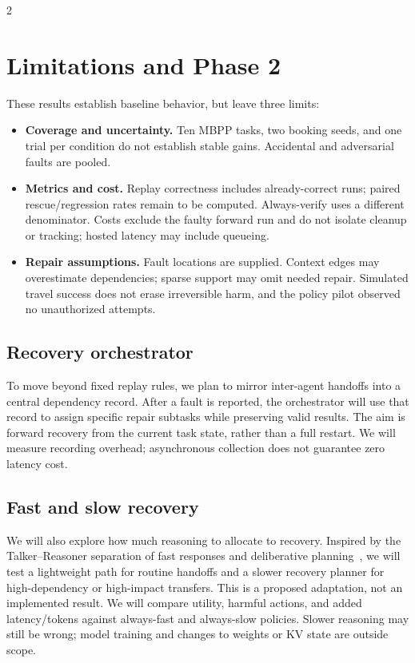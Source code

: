 \documentclass[9pt]{extarticle}
\begin{document}
\begin{multicols}{2}
\section{Limitations and Phase 2}
These results establish baseline behavior, but leave three limits:
\begin{itemize}
\item \textbf{Coverage and uncertainty.} Ten MBPP tasks, two booking seeds, and one trial per condition do not establish stable gains. Accidental and adversarial faults are pooled.
\item \textbf{Metrics and cost.} Replay correctness includes already-correct runs; paired rescue/regression rates remain to be computed. Always-verify uses a different denominator. Costs exclude the faulty forward run and do not isolate cleanup or tracking; hosted latency may include queueing.
\item \textbf{Repair assumptions.} Fault locations are supplied. Context edges may overestimate dependencies; sparse support may omit needed repair. Simulated travel success does not erase irreversible harm, and the policy pilot observed no unauthorized attempts.
\end{itemize}
\subsection{Recovery orchestrator}
To move beyond fixed replay rules, we plan to mirror inter-agent handoffs into a central dependency record. After a fault is reported, the orchestrator will use that record to assign specific repair subtasks while preserving valid results. The aim is forward recovery from the current task state, rather than a full restart. We will measure recording overhead; asynchronous collection does not guarantee zero latency cost.

\subsection{Fast and slow recovery}
We will also explore how much reasoning to allocate to recovery. Inspired by the Talker--Reasoner separation of fast responses and deliberative planning~\cite{talkerreasoner}, we will test a lightweight path for routine handoffs and a slower recovery planner for high-dependency or high-impact transfers. This is a proposed adaptation, not an implemented result. We will compare utility, harmful actions, and added latency/tokens against always-fast and always-slow policies. Slower reasoning may still be wrong; model training and changes to weights or KV state are outside scope.


\end{multicols}
\end{document}
